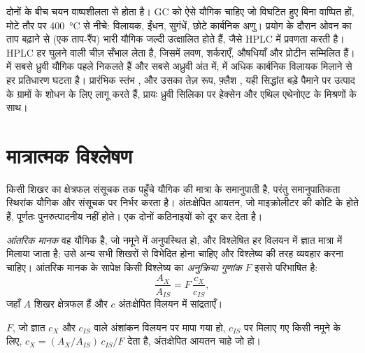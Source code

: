 दोनों के बीच चयन वाष्पशीलता से होता है। GC को ऐसे यौगिक चाहिए जो विघटित हुए बिना वाष्पित हों,
मोटे तौर पर \qty{400}{\degreeCelsius} से नीचे: विलायक, ईंधन, सुगंधें, छोटे कार्बनिक अणु। प्रयोग के दौरान
ओवन का ताप बढ़ाने से (एक ताप-रैंप) भारी यौगिक जल्दी उत्क्षालित होते हैं, जैसे HPLC में
प्रवणता करती है। HPLC हर घुलने वाली चीज़ सँभाल लेता है, जिसमें लवण, शर्कराएँ, औषधियाँ और प्रोटीन सम्मिलित हैं।
 में सबसे ध्रुवी यौगिक पहले निकलते हैं और सबसे अध्रुवी अंत में;  में अधिक कार्बनिक
विलायक मिलाने से हर प्रतिधारण घटता है। प्रारंभिक स्तंभ , और उसका तेज़
रूप, फ़्लैश , यही सिद्धांत बड़े पैमाने पर उत्पाद के ग्रामों के शोधन के लिए लागू करते हैं,
प्रायः ध्रुवी सिलिका पर हेक्सेन और एथिल एथेनोएट के मिश्रणों के साथ।

\section{मात्रात्मक विश्लेषण}

किसी शिखर का क्षेत्रफल संसूचक तक पहुँचे यौगिक की मात्रा के समानुपाती है, परंतु
समानुपातिकता स्थिरांक यौगिक और संसूचक पर निर्भर करता है। अंतःक्षेपित आयतन, जो
माइक्रोलीटर की कोटि के होते हैं, पूर्णतः पुनरुत्पादनीय नहीं होते। एक  दोनों कठिनाइयों को दूर कर देता है।

\begin{definition}[अनुक्रिया गुणांक और आंतरिक मानक]\label{def:b2:chromatography:quantitative}
\emph{आंतरिक मानक} वह यौगिक है, जो नमूने में अनुपस्थित हो, और विश्लेषित हर विलयन में
ज्ञात मात्रा में मिलाया जाता है; उसे अन्य सभी शिखरों से विभेदित होना चाहिए और विश्लेष्य की तरह व्यवहार करना चाहिए।
आंतरिक मानक के सापेक्ष किसी विश्लेष्य का \emph{अनुक्रिया गुणांक} $F$
इससे परिभाषित है:
\begin{equation*}
\frac{A_X}{A_{IS}} = F\,\frac{c_X}{c_{IS}},
\end{equation*}
जहाँ $A$ शिखर क्षेत्रफल हैं और $c$ अंतःक्षेपित विलयन में सांद्रताएँ।
\end{definition}

\begin{proposition}[आंतरिक-मानक मात्रांकन]\label{prop:b2:chromatography:internal-standard}
$F$, जो ज्ञात $c_X$ और $c_{IS}$ वाले अंशांकन विलयन पर मापा गया हो,  $c_{IS}$ पर मिलाए गए किसी नमूने के लिए,
$c_X = (A_X/A_{IS})\,c_{IS}/F$ देता है, अंतःक्षेपित आयतन चाहे जो हो।
\end{proposition}

